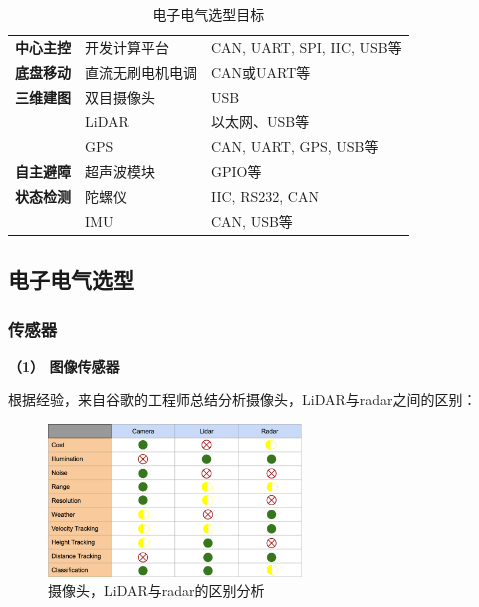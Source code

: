 \begin{table}[htbp]
	\centering%
	\caption[centering]{电子电气选型目标}%
	\label{dzdqxxmb}%
	\begin{tabular}{C{3cm}C{3cm}C{6cm}}	
		\toprule
		 & & \\ 
		\midrule
			\textbf{中心主控} & 开发计算平台 & CAN, UART, SPI, IIC, USB等\\
		    \textbf{底盘移动} & 直流无刷电机电调 & CAN或UART等\\
		    \textbf{三维建图} & 双目摄像头 & USB\\
		    & LiDAR & 以太网、USB等\\
		    & GPS   & CAN, UART, GPS, USB等\\
		    \textbf{自主避障} & 超声波模块 & GPIO等\\
		    \textbf{状态检测} & 陀螺仪 & IIC, RS232, CAN\\
		    & IMU & CAN, USB等\\
		\bottomrule
	\end{tabular}
\end{table}

\subsection{电子电气选型}

\subsubsection{传感器}


\textbf{（1） 图像传感器}

根据经验，来自谷歌的工程师总结分析摄像头，LiDAR与radar之间的区别：

\begin{figure}[H]
	\centering
	\includegraphics[width = 0.6\textwidth]{fig/shijueyj.png}
	\caption{摄像头，LiDAR与radar的区别分析}
	\label{shijueyj}
\end{figure}

